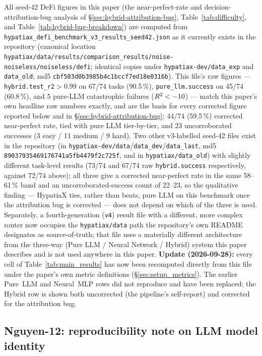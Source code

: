 \documentclass[twoside,11pt]{article}
\begin{document}
\begin{center}
{{All seed-42 DeFi figures in this paper (the near-perfect-rate and
decision-attribution-bug analysis of \S\ref{sec:hybrid-attribution-bug},
Table~\ref{tab:difficulty}, and Table~\ref{tab:hybrid-bug-breakdown}) are
computed from \texttt{hypatiax\_defi\_benchmark\_v3\_results\_seed42.json}
as it currently exists in the repository (canonical location
\texttt{hypatiax/data/results/comparison\_results/noise-noiseless/noiseless/defi};
identical copies under \texttt{hypatiax-dev/data\_exp} and \texttt{data\_old};
md5 \texttt{cbf503d0b3985b4c1bccf7ed18e0316b}). This file's raw figures
--- \texttt{hybrid.test\_r2}$>0.99$ on 67/74 tasks (90.5\,\%),
\texttt{pure\_llm.success} on 45/74 (60.8\,\%), and 5 pure-LLM
catastrophic failures ($R^{2}<-10$) --- match this paper's own headline
raw numbers exactly, and are the basis for every corrected figure
reported below and in \S\ref{sec:hybrid-attribution-bug}: 44/74 (59.5\,\%)
corrected near-perfect rate, tied with pure LLM tier-by-tier, and 23
uncorroborated successes (3 easy / 11 medium / 9 hard). Two other v3-labelled seed-42 files exist in the
repository (in \texttt{hypatiax-dev/data}/\texttt{data\_dev}/\texttt{data\_last},
md5 \texttt{89037935469176741a5fb4479f2c725f}, and in
\texttt{hypatiax/data\_old}) with slightly different task-level results
(73/74 and 67/74 raw \texttt{hybrid.success} respectively, against 72/74
above); all three give a corrected near-perfect rate in the same
58--61\,\% band and an uncorroborated-success count of 22--23, so the
qualitative finding --- HypatiaX ties, rather than beats, pure LLM on
this benchmark once the attribution bug is corrected --- does not depend
on which of the three is used. Separately, a fourth-generation
(\texttt{v4}) result file with a different, more complex router now
occupies the \texttt{hypatiax/data} path the repository's own README
designates as source-of-truth; that file uses a materially different
architecture from the three-way (Pure LLM / Neural Network / Hybrid)
system this paper describes and is not used anywhere in this paper. \textbf{Update (2026-09-28):} every cell of
Table~\ref{tab:main_results} has now been recomputed directly from this
file under the paper's own metric definitions (\S\ref{sec:setup_metrics}).
The earlier Pure~LLM and Neural~MLP rows did not reproduce and have been
replaced; the Hybrid row is shown both uncorrected (the pipeline's
self-report) and corrected for the attribution bug.}}
\end{center}
\vspace{0.5em}

\subsection{Nguyen-12: reproducibility note on LLM model identity}
\end{document}
